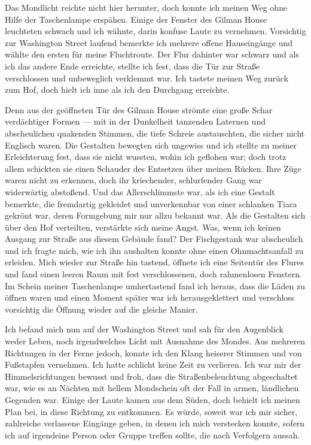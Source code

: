 Das Mondlicht reichte nicht hier herunter, doch konnte ich meinen Weg ohne Hilfe der Taschenlampe erspähen. Einige der Fenster des Gilman House leuchteten schwach und ich wähnte, darin konfuse Laute zu vernehmen. Vorsichtig zur Washington Street laufend bemerkte ich mehrere offene Hauseingänge und wählte den ersten für meine Fluchtroute. Der Flur dahinter war schwarz und als ich das andere Ende erreichte, stellte ich fest, dass die Tür zur Straße verschlossen und unbeweglich verklemmt war. Ich tastete meinen Weg zurück zum Hof, doch hielt ich inne als ich den Durchgang erreichte.

Denn aus der geöffneten Tür des Gilman House strömte eine große Schar verdächtiger Formen --- mit in der Dunkelheit tanzenden Laternen und abscheulichen quakenden Stimmen, die tiefe Schreie austauschten, die sicher nicht Englisch waren. Die Gestalten bewegten sich ungewiss und ich stellte zu meiner Erleichterung fest, dass sie nicht wussten, wohin ich geflohen war; doch trotz allem schickten sie einen Schauder des Entsetzen über meinen Rücken. Ihre Züge waren nicht zu erkennen, doch ihr kriechender, schlurfender Gang war widerwärtig abstoßend. Und das Allerschlimmste war, als ich eine Gestalt bemerkte, die fremdartig gekleidet und unverkennbar von einer schlanken Tiara gekrönt war, deren Formgebung mir nur allzu bekannt war. Als die Gestalten sich über den Hof verteilten, verstärkte sich meine Angst. Was, wenn ich keinen Ausgang zur Straße aus diesem Gebäude fand? Der Fischgestank war abscheulich und ich fragte mich, wie ich ihn aushalten konnte ohne einen Ohnmachtsanfall zu erleiden. Mich wieder zur Straße hin tastend, öffnete ich eine Seitentür des Flures und fand einen leeren Raum mit fest verschlossenen, doch rahmenlosen Fenstern. Im Schein meiner Taschenlampe umhertastend fand ich heraus, dass die Läden zu öffnen waren und einen Moment später war ich herausgeklettert und verschloss vorsichtig die Öffnung wieder auf die gleiche Manier.

Ich befand mich nun auf der Washington Street und sah für den Augenblick weder Leben, noch irgendwelches Licht mit Ausnahme des Mondes. Aus mehreren Richtungen in der Ferne jedoch, konnte ich den Klang heiserer Stimmen und von Fußstapfen vernehmen. Ich hatte schlicht keine Zeit zu verlieren. Ich war mir der Himmelsrichtungen bewusst und froh, dass die Straßenbeleuchtung abgeschaltet war, wie es an Nächten mit hellem Mondschein oft der Fall in armen, ländlichen Gegenden war. Einige der Laute kamen aus dem Süden, doch behielt ich meinen Plan bei, in diese Richtung zu entkommen. Es würde, soweit war ich mir sicher, zahlreiche verlassene Eingänge geben, in denen ich mich verstecken konnte, sofern ich auf irgendeine Person oder Gruppe treffen sollte, die nach Verfolgern aussah.


